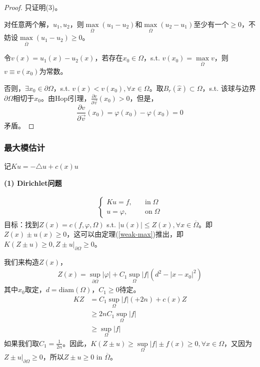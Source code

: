 \documentclass[11pt, a4paper]{article}
\theoremstyle{theorem}
\begin{document}
\begin{proof}
  只证明(3)。

  对任意两个解，$u_1, u_2$，则$\max\limits_{\overline{\Omega}} (u_1 - u_2)$和$\max\limits_{\overline{\Omega}} (u_2 - u_1)$至少有一个$\geq 0$，不妨设$\max\limits_{\overline{\Omega}} (u_1 - u_2) \geq 0$。

  令$v(x) = u_1(x) - u_2(x)$，若存在$x_0 \in \Omega$，s.t. $v(x_0) = \max\limits_{\overline{\Omega}} v$，则$v \equiv v(x_0)$为常数。

  否则，$\exists x_0 \in \partial \Omega$，s.t. $v(x) < v(x_0), \forall x \in \Omega$。取$B_r(\hat{x}) \subset \Omega$，s.t. 该球与边界$\partial \Omega$相切于$x_0$。由Hopf引理，$\frac{\partial v}{\partial \vec{v}}(x_0) > 0$，但是，
  $$
  \frac{\partial v}{\partial \vec{v}}(x_0) = \varphi(x_0) - \varphi(x_0) = 0
  $$
  矛盾。
\end{proof}

\subsubsection{最大模估计}

记$K u = - \triangle u + c(x) u$

\textbf{(1) Dirichlet问题}

\begin{align}
    \label{Q5-3-6}
    \begin{cases}
      K u = f, \quad &\text{in} \; \Omega \\
      u = \varphi, &\text{on} \; \Omega
    \end{cases}
\end{align}
目标：找到$Z(x) = c(f,\varphi, \Omega)$ s.t. $|u(x)| \leq Z(x), \forall x \in \overline{\Omega}$。即$Z(x) \pm u(x) \geq 0$，这可以由定理(\ref{weak-max})推出，即$K(Z \pm u) \geq 0, Z \pm u \bigg|_{\partial \Omega} \geq 0$。

我们来构造$Z(x)$，
\begin{align}
    Z(x) = \sup\limits_{\partial \Omega} |\varphi| + C_1 \sup\limits_{\Omega} |f| (d^2 - |x - x_0|^2)
\end{align}
其中$x_0$取定，$d = \text{diam}(\Omega)$，$C_1 \geq 0$待定。
\begin{align*}
    K Z &= C_1 \sup\limits_{\Omega} |f| ( + 2 n) + c(x) Z \\
    &\geq 2 n C_1 \sup\limits_{\Omega} |f| \\
    &\geq \sup\limits_{\Omega} |f|
\end{align*}
如果我们取$C_1 = \frac{1}{2n}$。因此，$K(Z \pm u) \geq \sup\limits_{\Omega} |f| \pm f(x) \geq 0, \forall x \in \Omega$，又因为$Z \pm u \bigg|_{\partial \Omega} \geq 0$，所以$Z \pm u \geq 0$ in $\overline{\Omega}$。
\end{document}
